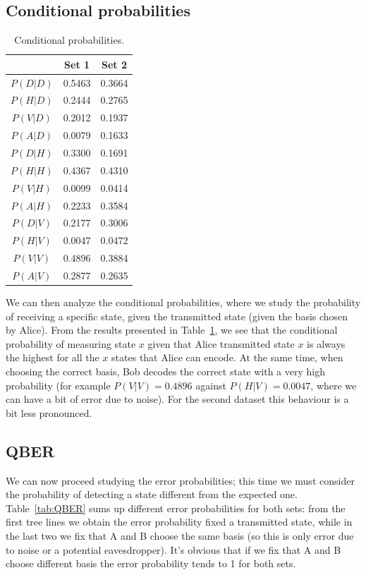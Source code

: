 \documentclass[prl,twocolumn]{revtex4-1}
\begin{document}
\subsection{Conditional probabilities}
\begin{table}[!b]
    \centering
    \begin{tabular}{c|c|c}
         & Set 1 & Set 2\\
         \hline
         \hline
        $P(D|D)$ & 0.5463 & 0.3664 \\
        \hline
        $P(H|D)$ & 0.2444 & 0.2765 \\
        \hline
        $P(V|D)$ & 0.2012 & 0.1937 \\
        \hline
        $P(A|D)$ & 0.0079 & 0.1633 \\
        \hline
        \hline
        $P(D|H)$ & 0.3300 & 0.1691 \\
        \hline
        $P(H|H)$ & 0.4367 & 0.4310 \\
        \hline
        $P(V|H)$ & 0.0099 & 0.0414 \\
        \hline
        $P(A|H)$ & 0.2233 & 0.3584 \\
        \hline
        \hline
        $P(D|V)$ & 0.2177 & 0.3006 \\
        \hline
        $P(H|V)$ & 0.0047 & 0.0472 \\
        \hline
        $P(V|V)$ & 0.4896 & 0.3884 \\
        \hline
        $P(A|V)$ & 0.2877 & 0.2635 \\
    \end{tabular}
    \caption{Conditional probabilities.}
    \label{tab:cond_probs}
\end{table}

We can then analyze the conditional probabilities, where we study the probability of receiving a specific state, given the transmitted state (given the basis chosen by Alice). From the results presented in Table~\ref{tab:cond_probs}, we see that the conditional probability of measuring state $x$ given that Alice transmitted state $x$ is always the highest for all the $x$ states that Alice can encode. At the same time, when choosing the correct basis, Bob decodes the correct state with a very high probability (for example $P(V|V)=0.4896$ against $P(H|V)=0.0047$, where we can have a bit of error due to noise). For the second dataset this behaviour is a bit less pronounced.


\subsection{QBER}
We can now proceed studying the error probabilities; this time we must consider the probability of detecting a state different from the expected one. Table~\ref{tab:QBER} sums up different error probabilities for both sets: from the first tree lines we obtain the error probability fixed a transmitted state, while in the last two we fix that A and B choose the same basis (so this is only error due to noise or a potential eavesdropper). It's obvious that if we fix that A and B choose different basis the error probability tends to 1 for both sets.
\end{document}
